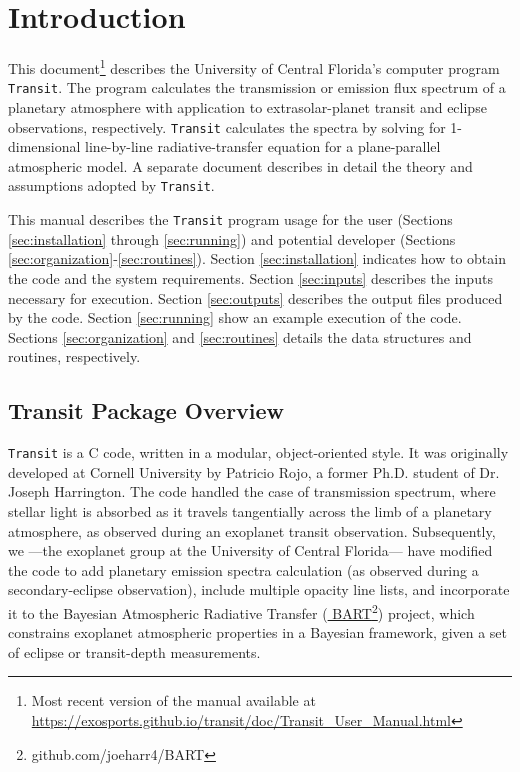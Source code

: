\documentclass[letterpaper, 12pt]{article}
\begin{document}
\section{Introduction}
\label{sec:intro}

This document\footnote{Most recent version of the manual available at 
\href{https://exosports.github.io/transit/doc/Transit_User_Manual.html}{https://exosports.github.io/transit/doc/Transit\_User\_Manual.html}} 
describes the University of Central Florida's computer
program {\tt Transit}.  The program calculates the transmission or
emission flux spectrum of a planetary atmosphere with
application to extrasolar-planet transit and eclipse observations,
respectively.  {\tt Transit} calculates the spectra by solving for
1-dimensional line-by-line radiative-transfer equation for a
plane-parallel atmospheric model.  A separate document  describes in detail the theory and assumptions adopted by
{\tt Transit}.

This manual describes the {\tt Transit} program usage for the user
(Sections \ref{sec:installation} through \ref{sec:running}) and
potential developer (Sections
\ref{sec:organization}-\ref{sec:routines}).  Section
\ref{sec:installation} indicates how to obtain the code and the system
requirements.  Section \ref{sec:inputs} describes the inputs necessary
for execution.  Section \ref{sec:outputs} describes the output files
produced by the code. Section \ref{sec:running} show an example
execution of the code.  
Sections \ref{sec:organization} and \ref{sec:routines} details the data
structures and routines, respectively.


\subsection{Transit Package Overview}

{\tt Transit} is a C code, written in a modular, object-oriented
style.  It was originally developed at Cornell University by Patricio
Rojo, a former Ph.D. student of Dr. Joseph Harrington.  The code
handled the case of transmission spectrum, where stellar light is
absorbed as it travels tangentially across the limb of a planetary
atmosphere, as observed during an exoplanet transit observation.
Subsequently, we ---the exoplanet group at the University of Central
Florida--- have modified the code to add planetary emission spectra
calculation (as observed during a secondary-eclipse observation),
include multiple opacity line lists, and incorporate it to the
Bayesian Atmospheric Radiative Transfer
(\href{https://github.com/joeharr4/BART} {\tttm
  BART}\footnote{github.com/joeharr4/BART}) project, which constrains
exoplanet atmospheric properties in a Bayesian framework, given a set
of eclipse or transit-depth measurements.
  
\end{document}
